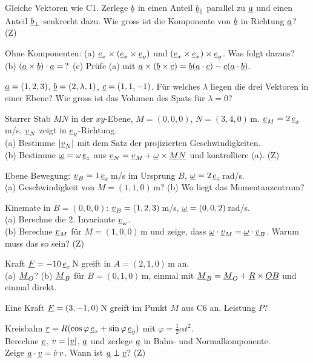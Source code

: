 \documentclass[11pt]{article}
\begin{document}
 Gleiche Vektoren wie C1. Zerlege $\underline{b}$ in einen Anteil $\underline{b}_\parallel$ parallel zu $\underline{a}$ und einen Anteil $\underline{b}_\perp$ senkrecht dazu. Wie gross ist die Komponente von $\underline{b}$ in Richtung $\underline{a}$? \hfill(Z)

 Ohne Komponenten: (a) $\underline{e}_{x}\times(\underline{e}_{x}\times\underline{e}_{y})$ und $(\underline{e}_{x}\times\underline{e}_{x})\times\underline{e}_{y}$. Was folgt daraus?\\
(b) $(\underline{a}\times\underline{b})\cdot\underline{a}=\,?$ \quad (c) Prüfe (a) mit $\underline{a}\times(\underline{b}\times\underline{c})=\underline{b}(\underline{a}\cdot\underline{c})-\underline{c}(\underline{a}\cdot\underline{b})$.

 $\underline{a}=(1,2,3)$, $\underline{b}=(2,\lambda,1)$, $\underline{c}=(1,1,-1)$. Für welches $\lambda$ liegen die drei Vektoren in einer Ebene? Wie gross ist das Volumen des Spats für $\lambda=0$?

 Starrer Stab $MN$ in der $xy$-Ebene, $M=(0,0,0)$, $N=(3,4,0)$\,m. $\underline{v}_M=2\,\underline{e}_{x}$\,m/s, $\underline{v}_N$ zeigt in $\underline{e}_{y}$-Richtung.\\
(a) Bestimme $|\underline{v}_N|$ mit dem Satz der projizierten Geschwindigkeiten.\\
(b) Bestimme $\underline{\omega}=\omega\,\underline{e}_{z}$ aus $\underline{v}_N=\underline{v}_M+\underline{\omega}\times\underline{MN}$ und kontrolliere (a). \hfill(Z)

 Ebene Bewegung: $\underline{v}_B=1\,\underline{e}_{x}$\,m/s im Ursprung $B$, $\underline{\omega}=2\,\underline{e}_{z}$\,rad/s.\\
(a) Geschwindigkeit von $M=(1,1,0)$\,m? \quad (b) Wo liegt das Momentanzentrum?

 Kinemate in $B=(0,0,0)$: $\underline{v}_B=(1,2,3)$\,m/s, $\underline{\omega}=(0,0,2)$\,rad/s.\\
(a) Berechne die 2. Invariante $\underline{v}_\omega$.\\
(b) Berechne $\underline{v}_M$ für $M=(1,0,0)$\,m und zeige, dass $\underline{\omega}\cdot\underline{v}_M=\underline{\omega}\cdot\underline{v}_B$. Warum muss das so sein? \hfill(Z)

 Kraft $\underline{F}=-10\,\underline{e}_{z}$\,N greift in $A=(2,1,0)$\,m an.\\
(a) $\underline{M}_O$? \quad (b) $\underline{M}_B$ für $B=(0,1,0)$\,m, einmal mit $\underline{M}_B=\underline{M}_O+\underline{R}\times\underline{OB}$ und einmal direkt.

 Eine Kraft $\underline{F}=(3,-1,0)$\,N greift im Punkt $M$ aus C6 an. Leistung $P$?

 Kreisbahn $\underline{r}=R(\cos\varphi\,\underline{e}_{x}+\sin\varphi\,\underline{e}_{y})$ mit $\varphi=\tfrac12\alpha t^2$.\\
Berechne $\underline{v}$, $v=|\underline{v}|$, $\underline{a}$ und zerlege $\underline{a}$ in Bahn- und Normalkomponente.\\
Zeige $\underline{a}\cdot\underline{v}=\dot v\,v$. Wann ist $\underline{a}\perp\underline{v}$? \hfill(Z)
\end{document}
